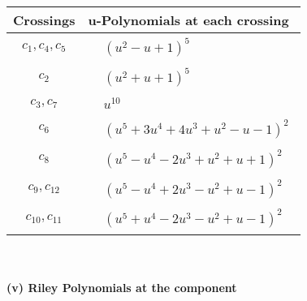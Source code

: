 \documentclass[1p]{elsarticle_modified}
\theoremstyle{definition}
\begin{document}
\begin{tabular}{m{50pt}|m{274pt}}
Crossings & \hspace{64pt}u-Polynomials at each crossing \\
\hline $$\begin{aligned}c_{1},c_{4},c_{5}\end{aligned}$$&$\begin{aligned}
&(u^2- u+1)^5
\end{aligned}$\\
\hline $$\begin{aligned}c_{2}\end{aligned}$$&$\begin{aligned}
&(u^2+u+1)^5
\end{aligned}$\\
\hline $$\begin{aligned}c_{3},c_{7}\end{aligned}$$&$\begin{aligned}
&u^{10}
\end{aligned}$\\
\hline $$\begin{aligned}c_{6}\end{aligned}$$&$\begin{aligned}
&(u^5+3 u^4+4 u^3+u^2- u-1)^2
\end{aligned}$\\
\hline $$\begin{aligned}c_{8}\end{aligned}$$&$\begin{aligned}
&(u^5- u^4-2 u^3+u^2+u+1)^2
\end{aligned}$\\
\hline $$\begin{aligned}c_{9},c_{12}\end{aligned}$$&$\begin{aligned}
&(u^5- u^4+2 u^3- u^2+u-1)^2
\end{aligned}$\\
\hline $$\begin{aligned}c_{10},c_{11}\end{aligned}$$&$\begin{aligned}
&(u^5+u^4-2 u^3- u^2+u-1)^2
\end{aligned}$\\
\hline
\end{tabular}\\~\\
\newpage\renewcommand{\arraystretch}{1}
\flushleft \textbf{(v) Riley Polynomials at the component}\newline \\
\end{document}
